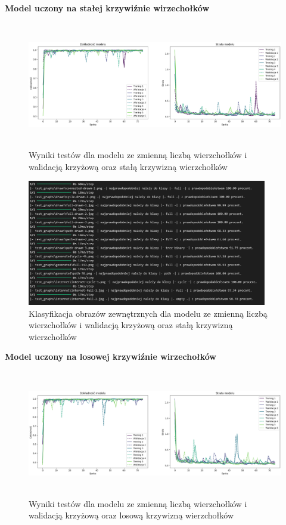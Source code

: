 \textbf{Model uczony na stałej krzywiźnie wirzechołków}

\begin{figure}[ht]
	\centering
	\includegraphics[height=5.5cm]{resources/tests/images/v2/multiple_edges_crossvalid_img.png}
	\caption{Wyniki testów dla modelu ze zmienną liczbą wierzchołków i walidacją krzyżową oraz stałą krzywizną wierzchołków}
	\label{Fig:tests-csvar-1}
\end{figure}
\FloatBarrier

\begin{figure}[ht]
	\centering
	\includegraphics[height=5.5cm]{resources/tests/images/v2/multiple_edges_crossvalid_txt.png}
	\caption{Klasyfikacja obrazów zewnętrznych dla modelu ze zmienną liczbą wierzchołków i walidacją krzyżową oraz stałą krzywizną wierzchołków}
	\label{Fig:tests-csvar-2}
\end{figure}
\FloatBarrier

\textbf{Model uczony na losowej krzywiźnie wirzechołków}

\begin{figure}[ht]
	\centering
	\includegraphics[height=5.5cm]{resources/tests/images/v3/multiple_edges_crossvalid_img.png}
	\caption{Wyniki testów dla modelu ze zmienną liczbą wierzchołków i walidacją krzyżową oraz losową krzywizną wierzchołków}
	\label{Fig:tests-csvar-1}
\end{figure}
\FloatBarrier

